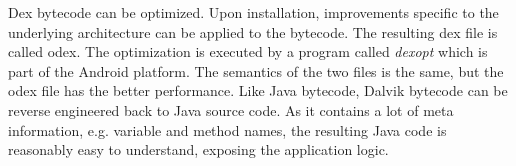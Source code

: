 \newline
Dex bytecode can be optimized.
Upon installation, improvements specific to the underlying architecture can be applied to the bytecode.
The resulting \gls{dex} file is called \gls{odex}.
The optimization is executed by a program called \textit{dexopt} which is part of the Android platform.
The semantics of the two files is the same, but the \gls{odex} file has the better performance.
\newline
Like Java bytecode, Dalvik bytecode can be reverse engineered back to Java source code.
As it contains a lot of meta information, e.g. variable and method names, the resulting Java code is reasonably easy to understand, exposing the application logic.

